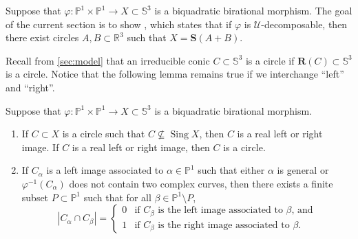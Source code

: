 \documentclass[11pt]{article}
\newenvironment{claims}{\begin{enumerate}[topsep=0pt,itemsep=0pt,leftmargin=8mm,label=\textnormal{\textbf{(\alph*)}},ref=(\alph*)]}{\end{enumerate}}
\newcommand{\R}{\mathbb{R}}
\renewcommand{\P}{\mathbb{P}}
\renewcommand{\S}{\mathbb{S}}
\newcommand{\bR}{\mathbf{R}}
\newcommand{\bS}{\mathbf{S}}
\newcommand{\cU}{\mathcal{U}}
\renewcommand{\c}{\colon}
\newcommand{\Sing}{\operatorname{Sing}}
\newcommand{\st}{such that }
\begin{document}
Suppose that $\varphi\c\P^1\times\P^1\to X\subset \S^3$ is a biquadratic birational morphism.
The goal of the current section is to show ,
which states that if $\varphi$ is $\cU$-decomposable, then
there exist circles $A,B\subset\R^3$ \st $X=\bS(A+B)$.

Recall from \textsection\ref{sec:model} that an irreducible conic $C\subset\S^3$
is a circle if $\bR(C)\subset\S^3$ is a circle.
Notice that the following lemma remains true if we interchange ``left'' and ``right''.

\begin{lemma}
\label{lem:C}
Suppose that $\varphi\c\P^1\times\P^1\to X\subset\S^3$ is a biquadratic birational morphism.
\begin{claims}
\item\label{lem:C:a}
If $C\subset X$ is a circle \st $C\nsubseteq\Sing X$,
then $C$ is a real left or right image.
If $C$ is a real left or right image,
then $C$ is a circle.

\item\label{lem:C:b}
If $C_\alpha$ is a left image associated to $\alpha\in\P^1$
\st either $\alpha$ is general or $\varphi^{-1}(C_\alpha)$ does not contain two complex curves,
then there exists a finite subset $P\subset\P^1$
\st for all $\beta\in\P^1\setminus P$,
\[
|C_\alpha\cap C_\beta|=
\begin{cases}
0 & \text{if $C_\beta$ is the left image associated to $\beta$, and}\\
1 & \text{if $C_\beta$ is the right image associated to $\beta$}.
\end{cases}
\]
\end{claims}
\end{lemma}
\end{document}
